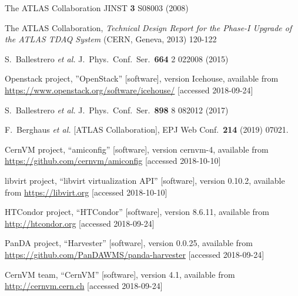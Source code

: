\documentclass{webofc}
\begin{document}
\begin{thebibliography}{}
   The ATLAS Collaboration
   JINST \textbf{3} S08003 (2008)

  The ATLAS Collaboration, \textit{Technical Design Report for the Phase-I
  Upgrade of the ATLAS TDAQ System} (CERN, Geneva, 2013) 120-122

    S.~Ballestrero {\it et al.}
    J.\ Phys.\ Conf.\ Ser.\  {\bf 664} 2  022008 (2015)

    Openstack project, ”OpenStack” [software], version Icehouse, available from
    \url{https://www.openstack.org/software/icehouse/} [accessed 2018-09-24]

    S.~Ballestrero {\it et al.}
    J.\ Phys.\ Conf.\ Ser.\  {\bf 898}  8 082012 (2017)

    F.~Berghaus {\it et al.} [ATLAS Collaboration],
    EPJ Web Conf.\  {\bf 214} (2019) 07021.

    CernVM project, ``amiconfig'' [software], version cernvm-4, available from
    \url{https://github.com/cernvm/amiconfig} [accessed 2018-10-10]

    libvirt project, ``libvirt virtualization API'' [software], version 0.10.2,
    available from \url{https://libvirt.org} [accessed 2018-10-10]

    HTCondor project, ``HTCondor'' [software], version 8.6.11, available from
    \url{http://htcondor.org} [accessed 2018-09-24]

    PanDA project, ``Harvester'' [software], version 0.0.25, available from
    \url{https://github.com/PanDAWMS/panda-harvester} [accessed 2018-09-24]

    CernVM team, ``CernVM'' [software], version 4.1, available from
    \url{http://cernvm.cern.ch} [accessed 2018-09-24]

\end{thebibliography}
\end{document}
